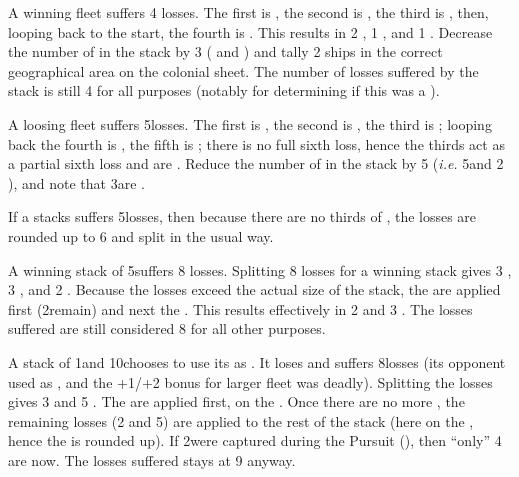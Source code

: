\begin{exemple}
  A winning fleet suffers 4 losses. The first is , the second
  is , the third is , then, looping back to
  the start, the fourth is . This results in 2 
  \ND, 1 , and 1 . Decrease the number of \ND
  in the stack by 3 ( and ) and tally 2
   ships in the correct geographical area on the colonial
  sheet. The number of losses suffered by the stack is still 4 for all
  purposes (notably for determining if this was a ).

  \smallskip

  A loosing \NWD fleet suffers 5\texttd losses. The first is ,
  the second is , the third is ; looping back
  the fourth is , the fifth is ; there is no
  full sixth loss, hence the thirds act as a partial sixth loss and are
  . Reduce the number of \ND in the stack by 5\texttd
  (\emph{i.e.} 5\ND and 2 \NDE), and note that 3\texttd are .

  \smallskip

  If a \NGD stacks suffers 5\texttu losses, then because there are no
  thirds of \NGD, the losses are rounded up to 6 and split in the usual way.

  \smallskip

  A winning stack of 5\ND suffers 8 losses. Splitting 8 losses for a winning
  stack gives 3 , 3 , and 2
  . Because the losses exceed the actual size of the stack,
  the  are applied first (2\ND remain) and next the
  . This results effectively in 2  and 3
  . The losses suffered are still considered 8 for all
  other purposes.

  \smallskip

  A stack of 1\NWD and 10\NGD chooses to use its \NWD as . It loses and suffers 8\texttd losses (its opponent used \NGD as
  , and the +1/+2 bonus for larger fleet was
  deadly). Splitting the losses gives 3  and 5\texttd
  . The  are applied first, on the
  . Once there are no more ,
  the remaining losses (2  and 5\texttd {}) are
  applied to the rest of the stack (here on the \NGD, hence the \texttd is
  rounded up). If 2\NGD were captured during the Pursuit (\textetoile), then
  ``only'' 4 are  now. The losses suffered stays at 9 anyway.
\end{exemple}

